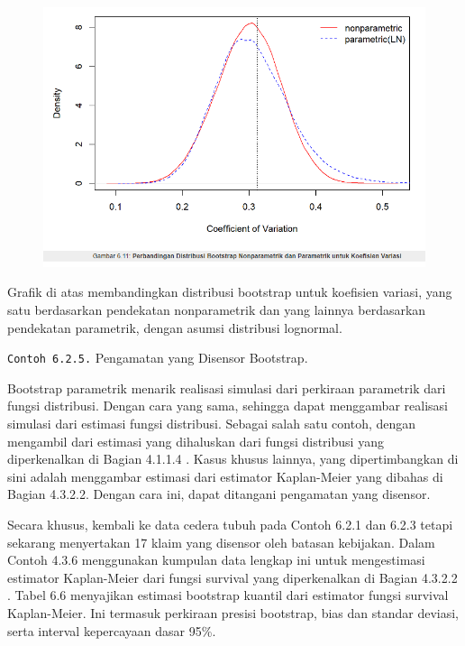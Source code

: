 \documentclass[
]{book}
\begin{document}
\begin{figure}

{\centering \includegraphics[width=1\linewidth]{images/6.2.3-3} 

}

\end{figure}

Grafik di atas membandingkan distribusi bootstrap untuk koefisien variasi, yang satu berdasarkan pendekatan nonparametrik dan yang lainnya berdasarkan pendekatan parametrik, dengan asumsi distribusi lognormal.

\texttt{Contoh\ 6.2.5.} Pengamatan yang Disensor Bootstrap.

Bootstrap parametrik menarik realisasi simulasi dari perkiraan parametrik dari fungsi distribusi. Dengan cara yang sama, sehingga dapat menggambar realisasi simulasi dari estimasi fungsi distribusi. Sebagai salah satu contoh, dengan mengambil dari estimasi yang dihaluskan dari fungsi distribusi yang diperkenalkan di Bagian 4.1.1.4 . Kasus khusus lainnya, yang dipertimbangkan di sini adalah menggambar estimasi dari estimator Kaplan-Meier yang dibahas di Bagian 4.3.2.2. Dengan cara ini, dapat ditangani pengamatan yang disensor.

Secara khusus, kembali ke data cedera tubuh pada Contoh 6.2.1 dan 6.2.3 tetapi sekarang menyertakan 17 klaim yang disensor oleh batasan kebijakan. Dalam Contoh 4.3.6 menggunakan kumpulan data lengkap ini untuk mengestimasi estimator Kaplan-Meier dari fungsi survival yang diperkenalkan di Bagian 4.3.2.2 . Tabel 6.6 menyajikan estimasi bootstrap kuantil dari estimator fungsi survival Kaplan-Meier. Ini termasuk perkiraan presisi bootstrap, bias dan standar deviasi, serta interval kepercayaan dasar 95\%.
\end{document}
